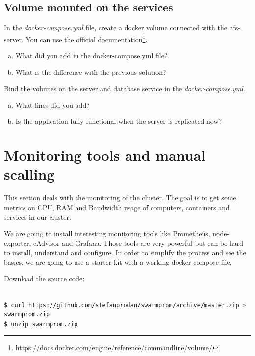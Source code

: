 \documentclass[a4paper,11pt]{exam}
\begin{document}
\subsection{Volume mounted on the services}

\begin{questions}
	\question In the \textit{docker-compose.yml} file, create a docker volume connected with the nfs-server. 
You can use the official documentation\footnote{https://docs.docker.com/engine/reference/commandline/volume/}.
	\begin{enumerate}[(a)]
		\item What did you add in the docker-compose.yml file?
		\item What is the difference with the previous solution?
	\end{enumerate}
	\question Bind the volumes on the server and database service in the \textit{docker-compose.yml}.
	\begin{enumerate}[(a)]
		\item What lines did you add?
		\item Is the application fully functional when the server is replicated now?
	\end{enumerate}
\end{questions}

\clearpage

\section{Monitoring tools and manual scalling}

This section deals with the monitoring of the cluster. The goal is to get some metrics on CPU, RAM and Bandwidth usage of computers, containers and services in our cluster.

We are going to install interesting monitoring tools like Prometheus, node-exporter, cAdvisor and Grafana. 
Those tools are very powerful but can be hard to install, understand and configure.
In order to simplify the process and see the basics, we are going to use a starter kit with a working docker compose file.

Download the source code:

\begin{lstlisting}[frame=single,language={sh}]  % Start your code-block

$ curl https://github.com/stefanprodan/swarmprom/archive/master.zip >  \
swarmprom.zip
$ unzip swarmprom.zip

\end{lstlisting}
\end{document}
